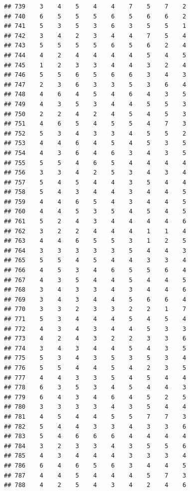\documentclass[
]{article}
\begin{document}
\begin{verbatim}
## 739    3    4    5    4    4    7    5    7    2
## 740    6    5    5    5    6    5    6    6    2
## 741    5    3    5    3    6    3    5    5    1
## 742    3    4    2    3    4    4    7    5    4
## 743    5    5    5    5    6    5    6    2    4
## 744    4    2    4    4    4    4    5    4    5
## 745    1    2    3    3    4    4    3    2    4
## 746    5    5    6    5    6    6    3    4    3
## 747    2    3    6    3    3    5    3    6    4
## 748    4    6    4    5    4    6    4    3    5
## 749    4    3    5    3    4    4    5    5    3
## 750    2    2    4    2    4    5    4    5    3
## 751    4    6    5    4    5    5    4    7    3
## 752    5    3    4    3    3    4    5    5    2
## 753    4    4    6    4    5    4    5    3    5
## 754    4    3    6    4    6    3    4    3    5
## 755    5    5    4    6    5    4    4    4    4
## 756    3    3    4    2    5    3    4    3    4
## 757    5    4    5    4    4    3    5    4    4
## 758    5    4    3    4    4    3    4    4    5
## 759    4    4    6    5    4    3    4    4    5
## 760    4    4    5    3    5    4    5    4    5
## 761    5    2    4    3    4    4    4    4    6
## 762    3    2    2    4    4    4    1    1    4
## 763    4    4    6    5    5    3    1    2    5
## 764    3    3    3    3    3    5    4    4    3
## 765    5    5    4    5    4    4    3    3    4
## 766    4    5    3    4    6    5    5    6    4
## 767    4    3    5    4    4    5    4    4    5
## 768    3    4    3    3    4    3    4    4    6
## 769    3    4    3    4    4    5    6    6    4
## 770    3    3    2    3    3    2    2    1    7
## 771    5    3    4    4    4    5    4    5    4
## 772    4    3    4    3    4    4    5    3    3
## 773    4    2    4    3    2    2    3    3    6
## 774    3    4    3    4    4    5    4    3    5
## 775    5    3    4    3    5    3    5    3    4
## 776    5    5    4    4    5    4    2    3    5
## 777    4    4    3    3    5    4    5    4    4
## 778    6    3    5    3    4    5    4    4    3
## 779    6    4    3    4    6    4    5    2    5
## 780    3    3    3    3    4    3    5    4    4
## 781    4    5    4    4    5    5    7    7    3
## 782    5    4    4    3    3    4    3    3    6
## 783    5    4    6    6    6    4    4    4    4
## 784    3    2    3    3    4    3    5    5    6
## 785    4    3    4    4    4    3    3    3    4
## 786    6    4    6    5    6    3    4    4    5
## 787    4    4    5    4    4    4    5    7    3
## 788    4    2    5    4    3    4    2    4    6

\end{verbatim}
\end{document}
